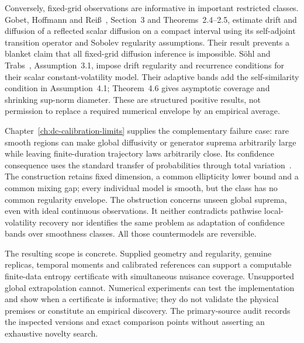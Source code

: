 Conversely, fixed-grid observations are informative in important restricted
classes. Gobet, Hoffmann and Rei\ss~\cite{dcGobet2004}, Section~3 and
Theorems~2.4--2.5, estimate drift and diffusion of a reflected scalar diffusion
on a compact interval using its self-adjoint transition operator and Sobolev
regularity assumptions. Their result prevents a blanket claim that all
fixed-grid diffusion inference is impossible. S\"ohl and
Trabs~\cite{dcSohl2016}, Assumption~3.1, impose drift regularity and recurrence
conditions for their scalar constant-volatility model. Their adaptive bands
add the self-similarity condition in Assumption~4.1; Theorem~4.6 gives
asymptotic coverage and shrinking sup-norm diameter. These are structured
positive results, not permission to replace a required numerical envelope by
an empirical average.

Chapter~\ref{ch:dc-calibration-limits} supplies the complementary failure
case: rare smooth regions can make global diffusivity or generator suprema
arbitrarily large while leaving finite-duration trajectory laws arbitrarily
close. Its confidence consequence uses the standard transfer of probabilities
through total variation~\cite{caLeCamYang2000}. The construction retains
fixed dimension, a common ellipticity lower bound and a common mixing gap;
every individual model is smooth, but the class has no common regularity
envelope. The obstruction concerns unseen global suprema, even with ideal
continuous observations. It neither contradicts pathwise local-volatility
recovery nor identifies the same problem as adaptation of confidence bands
over smoothness classes. All those countermodels are reversible.

The resulting scope is concrete. Supplied geometry and regularity, genuine
replicas, temporal moments and calibrated references can support a computable
finite-data entropy certificate with simultaneous nuisance coverage.
Unsupported global extrapolation cannot. Numerical experiments can test the
implementation and show when a certificate is informative; they do not
validate the physical premises or constitute an empirical discovery. The
primary-source audit records the inspected versions and exact comparison
points without asserting an exhaustive novelty search.
